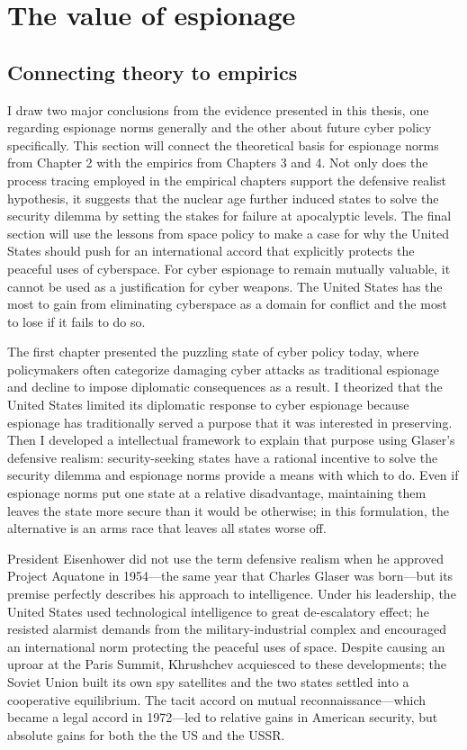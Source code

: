 \documentclass{memoir}
\begin{document}
\section{The value of espionage}
\subsection{Connecting theory to empirics}
I draw two major conclusions from the evidence presented in this thesis, one regarding espionage norms generally and the other about future cyber policy specifically. This section will connect the theoretical basis for espionage norms from Chapter 2 with the empirics from Chapters 3 and 4. Not only does the process tracing employed in the empirical chapters support the defensive realist hypothesis, it suggests that the nuclear age further induced states to solve the security dilemma by setting the stakes for failure at apocalyptic levels. The final section will use the lessons from space policy to make a case for why the United States should push for an international accord that explicitly protects the peaceful uses of cyberspace. For cyber espionage to remain mutually valuable, it cannot be used as a justification for cyber weapons. The United States has the most to gain from eliminating cyberspace as a domain for conflict and the most to lose if it fails to do so.

The first chapter presented the puzzling state of cyber policy today, where policymakers often categorize damaging cyber attacks as traditional espionage and decline to impose diplomatic consequences as a result. I theorized that the United States limited its diplomatic response to cyber espionage because espionage has traditionally served a purpose that it was interested in preserving. Then I developed a intellectual framework to explain that purpose using Glaser's defensive realism: security-seeking states have a rational incentive to solve the security dilemma and espionage norms provide a means with which to do. Even if espionage norms put one state at a relative disadvantage, maintaining them leaves the state more secure than it would be otherwise; in this formulation, the alternative is an arms race that leaves all states worse off.

President Eisenhower did not use the term defensive realism when he approved Project Aquatone in 1954---the same year that Charles Glaser was born---but its premise perfectly describes his approach to intelligence. Under his leadership, the United States used technological intelligence to great de-escalatory effect; he resisted alarmist demands from the military-industrial complex and encouraged an international norm protecting the peaceful uses of space. Despite causing an uproar at the Paris Summit, Khrushchev acquiesced to these developments; the Soviet Union built its own spy satellites and the two states settled into a cooperative equilibrium. The tacit accord on mutual reconnaissance---which became a legal accord in 1972---led to relative gains in American security, but absolute gains for both the the US and the USSR.
\end{document}
